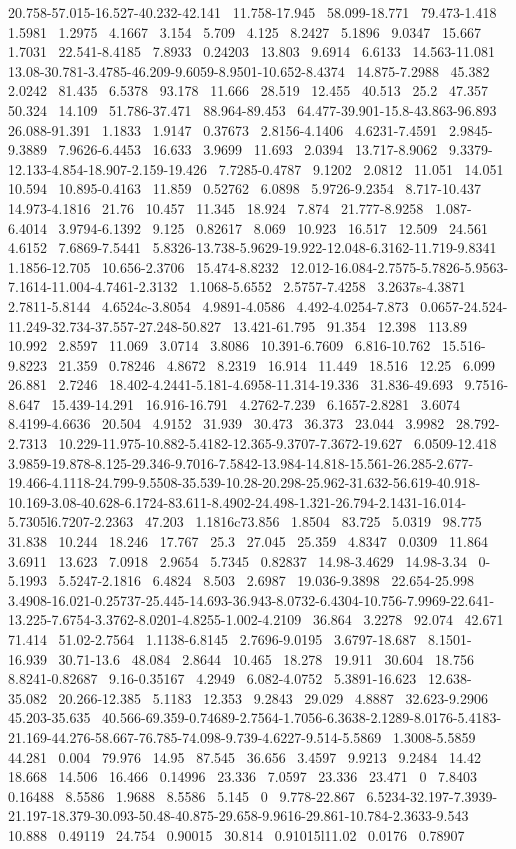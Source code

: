 \documentclass{article}
\begin{document}
20.758-57.015-16.527-40.232-42.141~ 11.758-17.945~ 58.099-18.771~ 79.473-1.418~ 1.5981~ 1.2975~ 4.1667~ 3.154~ 5.709~ 4.125~ 8.2427~ 5.1896~ 9.0347~ 15.667~ 1.7031~ 22.541-8.4185~ 7.8933~ 0.24203~ 13.803~ 9.6914~ 6.6133~ 14.563-11.081~ 13.08-30.781-3.4785-46.209-9.6059-8.9501-10.652-8.4374~ 14.875-7.2988~ 45.382~ 2.0242~ 81.435~ 6.5378~ 93.178~ 11.666~ 28.519~ 12.455~ 40.513~ 25.2~ 47.357~ 50.324~ 14.109~ 51.786-37.471~ 88.964-89.453~ 64.477-39.901-15.8-43.863-96.893~ 26.088-91.391~ 1.1833~ 1.9147~ 0.37673~ 2.8156-4.1406~ 4.6231-7.4591~ 2.9845-9.3889~ 7.9626-6.4453~ 16.633~ 3.9699~ 11.693~ 2.0394~ 13.717-8.9062~ 9.3379-12.133-4.854-18.907-2.159-19.426~ 7.7285-0.4787~ 9.1202~ 2.0812~ 11.051~ 14.051~ 10.594~ 10.895-0.4163~ 11.859~ 0.52762~ 6.0898~ 5.9726-9.2354~ 8.717-10.437~ 14.973-4.1816~ 21.76~ 10.457~ 11.345~ 18.924~ 7.874~ 21.777-8.9258~ 1.087-6.4014~ 3.9794-6.1392~ 9.125~ 0.82617~ 8.069~ 10.923~ 16.517~ 12.509~ 24.561~ 4.6152~ 7.6869-7.5441~ 5.8326-13.738-5.9629-19.922-12.048-6.3162-11.719-9.8341~ 1.1856-12.705~ 10.656-2.3706~ 15.474-8.8232~ 12.012-16.084-2.7575-5.7826-5.9563-7.1614-11.004-4.7461-2.3132~ 1.1068-5.6552~ 2.5757-7.4258~ 3.2637s-4.3871~ 2.7811-5.8144~ 4.6524c-3.8054~ 4.9891-4.0586~ 4.492-4.0254-7.873~ 0.0657-24.524-11.249-32.734-37.557-27.248-50.827~ 13.421-61.795~ 91.354~ 12.398~ 113.89~ 10.992~ 2.8597~ 11.069~ 3.0714~ 3.8086~ 10.391-6.7609~ 6.816-10.762~ 15.516-9.8223~ 21.359~ 0.78246~ 4.8672~ 8.2319~ 16.914~ 11.449~ 18.516~ 12.25~ 6.099~ 26.881~ 2.7246~ 18.402-4.2441-5.181-4.6958-11.314-19.336~ 31.836-49.693~ 9.7516-8.647~ 15.439-14.291~ 16.916-16.791~ 4.2762-7.239~ 6.1657-2.8281~ 3.6074~ 8.4199-4.6636~ 20.504~ 4.9152~ 31.939~ 30.473~ 36.373~ 23.044~ 3.9982~ 28.792-2.7313~ 10.229-11.975-10.882-5.4182-12.365-9.3707-7.3672-19.627~ 6.0509-12.418~ 3.9859-19.878-8.125-29.346-9.7016-7.5842-13.984-14.818-15.561-26.285-2.677-19.466-4.1118-24.799-9.5508-35.539-10.28-20.298-25.962-31.632-56.619-40.918-10.169-3.08-40.628-6.1724-83.611-8.4902-24.498-1.321-26.794-2.1431-16.014-5.7305l6.7207-2.2363~ 47.203~ 1.1816c73.856~ 1.8504~ 83.725~ 5.0319~ 98.775~ 31.838~ 10.244~ 18.246~ 17.767~ 25.3~ 27.045~ 25.359~ 4.8347~ 0.0309~ 11.864~ 3.6911~ 13.623~ 7.0918~ 2.9654~ 5.7345~ 0.82837~ 14.98-3.4629~ 14.98-3.34~ 0-5.1993~ 5.5247-2.1816~ 6.4824~ 8.503~ 2.6987~ 19.036-9.3898~ 22.654-25.998~ 3.4908-16.021-0.25737-25.445-14.693-36.943-8.0732-6.4304-10.756-7.9969-22.641-13.225-7.6754-3.3762-8.0201-4.8255-1.002-4.2109~ 36.864~ 3.2278~ 92.074~ 42.671~ 71.414~ 51.02-2.7564~ 1.1138-6.8145~ 2.7696-9.0195~ 3.6797-18.687~ 8.1501-16.939~ 30.71-13.6~ 48.084~ 2.8644~ 10.465~ 18.278~ 19.911~ 30.604~ 18.756~ 8.8241-0.82687~ 9.16-0.35167~ 4.2949~ 6.082-4.0752~ 5.3891-16.623~ 12.638-35.082~ 20.266-12.385~ 5.1183~ 12.353~ 9.2843~ 29.029~ 4.8887~ 32.623-9.2906~ 45.203-35.635~ 40.566-69.359-0.74689-2.7564-1.7056-6.3638-2.1289-8.0176-5.4183-21.169-44.276-58.667-76.785-74.098-9.739-4.6227-9.514-5.5869~ 1.3008-5.5859~ 44.281~ 0.004~ 79.976~ 14.95~ 87.545~ 36.656~ 3.4597~ 9.9213~ 9.2484~ 14.42~ 18.668~ 14.506~ 16.466~ 0.14996~ 23.336~ 7.0597~ 23.336~ 23.471~ 0~ 7.8403~ 0.16488~ 8.5586~ 1.9688~ 8.5586~ 5.145~ 0~ 9.778-22.867~ 6.5234-32.197-7.3939-21.197-18.379-30.093-50.48-40.875-29.658-9.9616-29.861-10.784-2.3633-9.543~ 10.888~ 0.49119~ 24.754~ 0.90015~ 30.814~ 0.91015l11.02~ 0.0176~ 0.78907~ 
\end{document}
